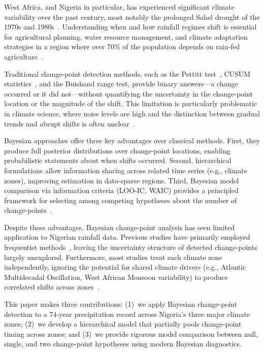 \documentclass[conference]{IEEEtran}
\begin{document}
West Africa, and Nigeria in particular, has experienced significant climate variability over the past century, most notably the prolonged Sahel drought of the 1970s and 1980s~\cite{nicholson2013west, lebel2009recent}. Understanding when and how rainfall regimes shift is essential for agricultural planning, water resource management, and climate adaptation strategies in a region where over 70\% of the population depends on rain-fed agriculture~\cite{odekunle2006rainfall}.

Traditional change-point detection methods, such as the Pettitt test~\cite{pettitt1979non}, CUSUM statistics~\cite{page1954continuous}, and the Buishand range test, provide binary answers---a change occurred or it did not---without quantifying the uncertainty in the change-point location or the magnitude of the shift. This limitation is particularly problematic in climate science, where noise levels are high and the distinction between gradual trends and abrupt shifts is often unclear~\cite{reeves2007review}.

Bayesian approaches offer three key advantages over classical methods. First, they produce full posterior distributions over change-point locations, enabling probabilistic statements about when shifts occurred. Second, hierarchical formulations allow information sharing across related time series (e.g., climate zones), improving estimation in data-sparse regions. Third, Bayesian model comparison via information criteria (LOO-IC, WAIC) provides a principled framework for selecting among competing hypotheses about the number of change-points~\cite{vehtari2017practical}.

Despite these advantages, Bayesian change-point analysis has seen limited application to Nigerian rainfall data. Previous studies have primarily employed frequentist methods~\cite{obot2010trends, odekunle2006rainfall, oguntunde2011assessment}, leaving the uncertainty structure of detected change-points largely unexplored. Furthermore, most studies treat each climate zone independently, ignoring the potential for shared climate drivers (e.g., Atlantic Multidecadal Oscillation, West African Monsoon variability) to produce correlated shifts across zones~\cite{rodriguez2015variability}.

This paper makes three contributions: (1)~we apply Bayesian change-point detection to a 74-year precipitation record across Nigeria's three major climate zones; (2)~we develop a hierarchical model that partially pools change-point timing across zones; and (3)~we provide rigorous model comparison between null, single, and two change-point hypotheses using modern Bayesian diagnostics.
\end{document}
